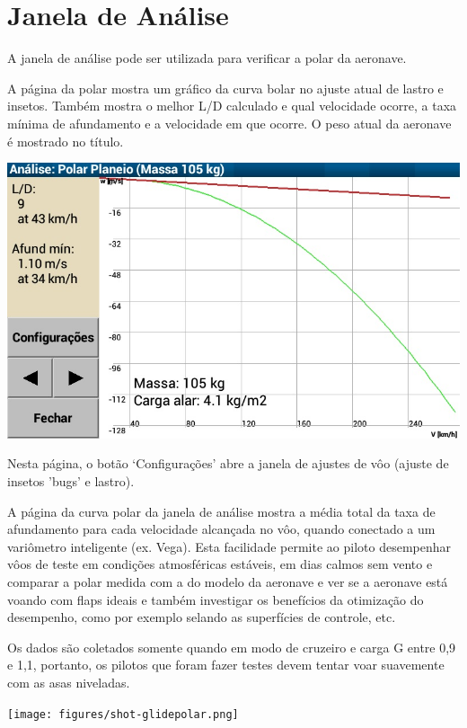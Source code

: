 \section{Janela de Análise}

A janela de análise pode ser utilizada para verificar a polar da aeronave.

A página da polar mostra um gráfico da curva bolar no ajuste atual de lastro e insetos.  Também mostra o melhor L/D calculado e qual velocidade ocorre, a taxa mínima de afundamento e a velocidade em que ocorre.  O peso atual da aeronave é mostrado no título.  


\begin{center}
\includegraphics[angle=0,width=0.8\linewidth,keepaspectratio='true']{figures/analysis-glidepolar.png}
\end{center}

Nesta página, o botão ‘Configurações’ abre a janela de ajustes de vôo (ajuste de insetos 'bugs' e lastro).

A página da curva polar da janela de análise mostra a média total da taxa de afundamento para cada velocidade alcançada no vôo, quando conectado a um variômetro inteligente (ex. Vega).  Esta facilidade permite ao piloto desempenhar vôos de teste em condições atmosféricas estáveis, em dias calmos sem vento e comparar a polar medida com a do modelo da aeronave e ver se a aeronave está voando com flaps ideais e também investigar os benefícios da otimização do desempenho, como por exemplo selando as superfícies de controle, etc.

Os dados são coletados somente quando em modo de cruzeiro e carga G entre 0,9 e 1,1, portanto, os pilotos que foram fazer testes devem tentar voar suavemente com as asas niveladas.


\begin{center}
\texttt{[image: figures/shot-glidepolar.png]}
\end{center}



